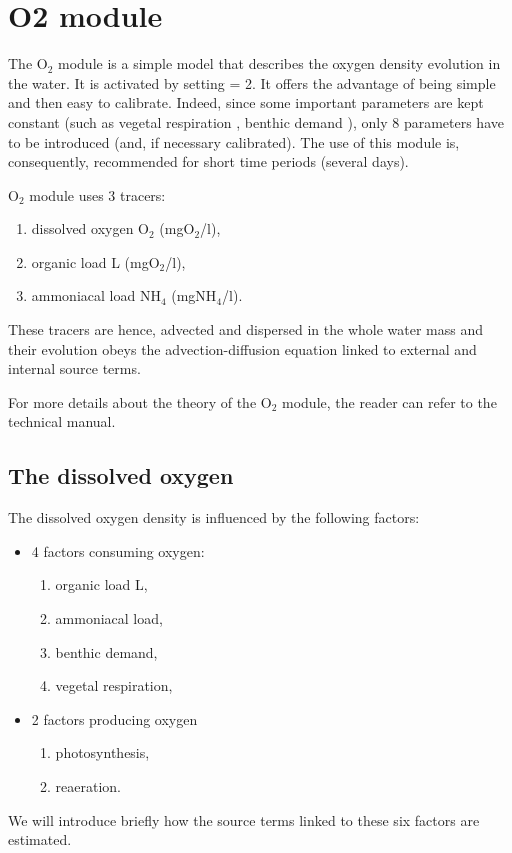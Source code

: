 \chapter{O2 module}
\label{subs:O2:mod}

The O$_2$ module is a simple model that describes the oxygen density evolution in the water.
It is activated by setting  = 2.
It offers the advantage of being simple and then easy to calibrate.
Indeed, since some important parameters are kept constant
(such as vegetal respiration ,
benthic demand ),
only 8 parameters have to be introduced (and, if necessary calibrated).
The use of this module is, consequently, recommended for short time periods (several days).

O$_2$ module uses 3 tracers:

\begin{enumerate}
\item dissolved oxygen O$_2$ (mgO$_2$/l),
\item organic load L (mgO$_2$/l),
\item ammoniacal load NH$_4$ (mgNH$_4$/l).
\end{enumerate}

These tracers are hence, advected and dispersed in the whole water mass
and their evolution obeys the advection-diffusion equation linked to external and internal source terms.

For more details about the theory of the O$_2$ module,
the reader can refer to the \waqtel technical manual.


\section{The dissolved oxygen}

The dissolved oxygen density is influenced by the following factors:

\begin{itemize}
\item 4 factors consuming oxygen:

\begin{enumerate}
\item organic load L,
\item ammoniacal load,
\item benthic demand,
\item vegetal respiration,
\end{enumerate}

\item 2 factors producing oxygen
\begin{enumerate}
\item photosynthesis,

\item reaeration.
\end{enumerate}
\end{itemize}
We will introduce briefly how the source terms linked to these six factors are estimated.


